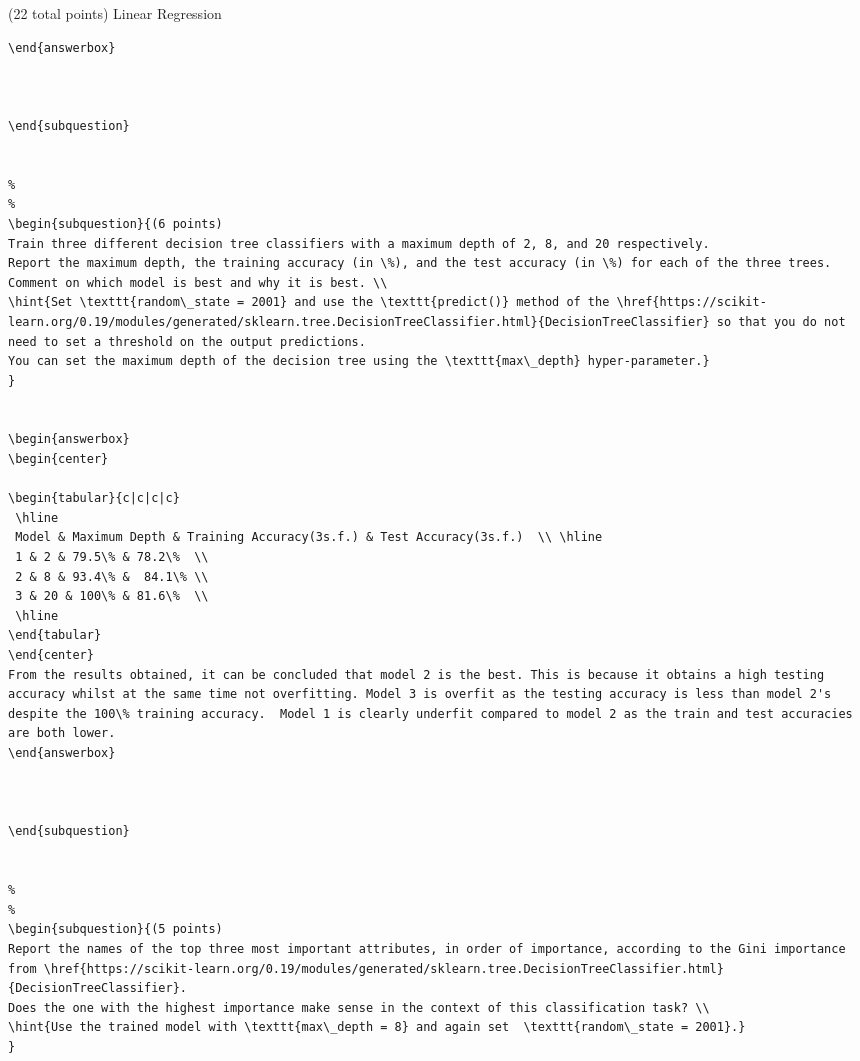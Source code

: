 \documentclass[12pt]{article}
\begin{document}
\begin{question}{(22 total points) Linear Regression}
\begin{subquestion}
\begin{answerbox}{20em}
\begin {verbatim}
\end{answerbox}



\end{subquestion}


%
%
\begin{subquestion}{(6 points) 
Train three different decision tree classifiers with a maximum depth of 2, 8, and 20 respectively.
Report the maximum depth, the training accuracy (in \%), and the test accuracy (in \%) for each of the three trees.
Comment on which model is best and why it is best. \\
\hint{Set \texttt{random\_state = 2001} and use the \texttt{predict()} method of the \href{https://scikit-learn.org/0.19/modules/generated/sklearn.tree.DecisionTreeClassifier.html}{DecisionTreeClassifier} so that you do not need to set a threshold on the output predictions.
You can set the maximum depth of the decision tree using the \texttt{max\_depth} hyper-parameter.}
}


\begin{answerbox}{20em}
\begin{center}

\begin{tabular}{c|c|c|c}
 \hline
 Model & Maximum Depth & Training Accuracy(3s.f.) & Test Accuracy(3s.f.)  \\ \hline
 1 & 2 & 79.5\% & 78.2\%  \\
 2 & 8 & 93.4\% &  84.1\% \\
 3 & 20 & 100\% & 81.6\%  \\
 \hline
\end{tabular}
\end{center}
From the results obtained, it can be concluded that model 2 is the best. This is because it obtains a high testing accuracy whilst at the same time not overfitting. Model 3 is overfit as the testing accuracy is less than model 2's despite the 100\% training accuracy.  Model 1 is clearly underfit compared to model 2 as the train and test accuracies are both lower.
\end{answerbox}



\end{subquestion}


%
%
\begin{subquestion}{(5 points) 
Report the names of the top three most important attributes, in order of importance, according to the Gini importance from \href{https://scikit-learn.org/0.19/modules/generated/sklearn.tree.DecisionTreeClassifier.html}{DecisionTreeClassifier}. 
Does the one with the highest importance make sense in the context of this classification task? \\
\hint{Use the trained model with \texttt{max\_depth = 8} and again set  \texttt{random\_state = 2001}.}
}



\end{verbatim}
\end{answerbox}
\end{subquestion}
\end{question}
\end{document}
